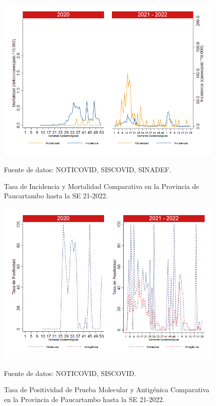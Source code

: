 \documentclass[12pt,a4paper,openany]{book}
\begin{document}
	\begin{figure}[h]
		\caption{Tasa de Incidencia y Mortalidad Comparativa en la Provincia de Paucartambo hasta la SE 21-2022.}\label{fig:inc_mort_paucartam}
		\begin{center}
			\includegraphics[width=0.85\linewidth]{../figuras/incidencia_mortalidad_20_21_11.png}
		\end{center}
		{\footnotesize {Fuente de datos: NOTICOVID, SISCOVID, SINADEF.}}
	\end{figure}
	
	\begin{figure}[h]
		\caption{Tasa de Positividad de Prueba Molecular y Antigénica Comparativa en la Provincia de Paucartambo hasta la SE 21-2022.}\label{fig:positividad_paucartam}
		\begin{center}
			\includegraphics[width=0.7\linewidth]{../figuras/positividad_20_21_11.png}
		\end{center}
		{\footnotesize {Fuente de datos: NOTICOVID, SISCOVID.}}
	\end{figure}
	
\end{document}
